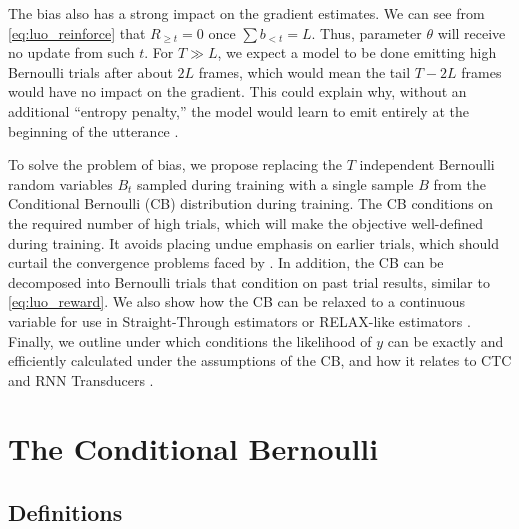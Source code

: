 \documentclass{article}
\begin{document}
The bias also has a strong impact on the gradient estimates. We can see from
\cref{eq:luo_reinforce} that $R_{\geq t} = 0$ once $\sum b_{<t} = L$. Thus,
parameter $\theta$ will receive no update from such $t$. For $T \gg L$, we
expect a model to be done emitting high Bernoulli trials after about $2L$
frames, which would mean the tail $T - 2L$ frames would have no impact on the
gradient. This could explain why, without an additional ``entropy penalty,''
the model would learn to emit entirely at the beginning of the utterance
\cite{luoLearningOnlineAlignments2017}.

To solve the problem of bias, we propose replacing the $T$ independent
Bernoulli random variables $B_t$ sampled during training with a single sample
$B$ from the Conditional Bernoulli (CB) distribution during training. The CB
conditions on the required number of high trials, which will make the objective
well-defined during training. It avoids placing undue emphasis on earlier
trials, which should curtail the convergence problems faced by
\citet{luoLearningOnlineAlignments2017}. In addition, the CB can be decomposed
into Bernoulli trials that condition on past trial results, similar to
\cref{eq:luo_reward}. We also show how the CB can be relaxed to a continuous
variable for use in Straight-Through estimators
\cite{bengioEstimatingPropagatingGradients2013,jangCategoricalReparameterizationGumbelSoftmax2017}
or RELAX-like estimators
\cite{maddisonConcreteDistributionContinuous2017,grathwohlBackpropagationVoidOptimizing2018}.
Finally, we outline under which conditions the likelihood of $y$ can be exactly
and efficiently calculated under the assumptions of the CB, and how it relates
to CTC and RNN Transducers \cite{gravesSequenceTransductionRecurrent2012}.

\section{The Conditional Bernoulli} \label{sec:cb}
\subsection{Definitions} \label{sec:cb_defns}
\end{document}
